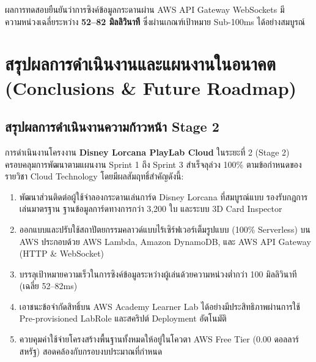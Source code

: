 \documentclass[12pt,a4paper]{report}
\begin{document}
ผลการทดสอบยืนยันว่าการซิงค์ข้อมูลกระดานผ่าน AWS API Gateway WebSockets มีความหน่วงเฉลี่ยระหว่าง \textbf{52--82 มิลลิวินาที} ซึ่งผ่านเกณฑ์เป้าหมาย Sub-100ms ได้อย่างสมบูรณ์

\chapter{สรุปผลการดำเนินงานและแผนงานในอนาคต (Conclusions \& Future Roadmap)}

\section{สรุปผลการดำเนินงานความก้าวหน้า Stage 2}
การดำเนินงานโครงงาน \textbf{Disney Lorcana PlayLab Cloud} ในระยะที่ 2 (Stage 2) ครอบคลุมการพัฒนาตามแผนงาน Sprint 1 ถึง Sprint 3 สำเร็จลุล่วง 100\% ตามข้อกำหนดของรายวิชา Cloud Technology โดยมีผลสัมฤทธิ์สำคัญดังนี้:
\begin{enumerate}
    \item พัฒนาส่วนติดต่อผู้ใช้จำลองกระดานเล่นการ์ด Disney Lorcana ที่สมบูรณ์แบบ รองรับกฎการเล่นมาตรฐาน ฐานข้อมูลการ์ดทางการกว่า 3,200 ใบ และระบบ 3D Card Inspector
    \item ออกแบบและปรับใช้สถาปัตยกรรมคลาวด์แบบไร้เซิร์ฟเวอร์เต็มรูปแบบ (100\% Serverless) บน AWS ประกอบด้วย AWS Lambda, Amazon DynamoDB, และ AWS API Gateway (HTTP \& WebSocket)
    \item บรรลุเป้าหมายความเร็วในการซิงค์ข้อมูลระหว่างผู้เล่นด้วยความหน่วงต่ำกว่า 100 มิลลิวินาที (เฉลี่ย 52--82ms)
    \item เอาชนะข้อจำกัดสิทธิ์บน AWS Academy Learner Lab ได้อย่างมีประสิทธิภาพผ่านการใช้ Pre-provisioned LabRole และสคริปต์ Deployment อัตโนมัติ
    \item ควบคุมค่าใช้จ่ายโครงสร้างพื้นฐานทั้งหมดให้อยู่ในโควตา AWS Free Tier (0.00 ดอลลาร์สหรัฐ) สอดคล้องกับกรอบงบประมาณที่กำหนด
\end{enumerate}
\end{document}
